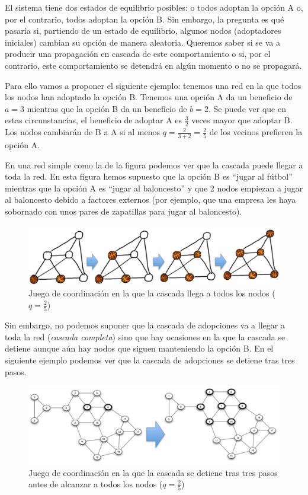 \documentclass[]{article}
\begin{document}
El sistema tiene dos estados de equilibrio posibles: o todos adoptan la
opción A o, por el contrario, todos adoptan la opción B. Sin embargo, la
pregunta es qué pasaría si, partiendo de un estado de equilibrio,
algunos nodos (adoptadores iniciales) cambian su opción de manera
aleatoria. Queremos saber si se va a producir una propagación en cascada
de este comportamiento o si, por el contrario, este comportamiento se
detendrá en algún momento o no se propagará.

Para ello vamos a proponer el siguiente ejemplo: tenemos una red en la
que todos los nodos han adoptado la opción B. Tenemos una opción A da un
beneficio de \(a=3\) mientras que la opción B da un beneficio de
\(b=2\). Se puede ver que en estas circunstancias, el beneficio de
adoptar A es \(\frac{3}{2}\) veces mayor que adoptar B. Los nodos
cambiarán de B a A si al menos \(q = \frac{2}{3+2} = \frac{2}{5}\) de
los vecinos prefieren la opción A.

En una red simple como la de la figura podemos ver que la cascada puede
llegar a toda la red. En esta figura hemos supuesto que la opción B es
``jugar al fútbol'' mientras que la opción A es ``jugar al baloncesto''
y que 2 nodos empiezan a jugar al baloncesto debido a factores externos
(por ejemplo, que una empresa les haya sobornado con unos pares de
zapatillas para jugar al baloncesto).

\begin{figure}[htbp]
\centering
\includegraphics{../images/tema08/coordinacion1.png}
\caption{Juego de coordinación en la que la cascada llega a todos los
nodos (\(q = \frac{2}{5}\))}
\end{figure}

Sin embargo, no podemos suponer que la cascada de adopciones va a llegar
a toda la red (\emph{cascada completa}) sino que hay ocasiones en la que
la cascada se detiene aunque aún hay nodos que siguen manteniendo la
opción B. En el siguiente ejemplo podemos ver que la cascada de
adopciones se detiene tras tres pasos.

\begin{figure}[htbp]
\centering
\includegraphics{../images/tema08/coordinacion2.png}
\caption{Juego de coordinación en la que la cascada se detiene tras tres
pasos antes de alcanzar a todos los nodos (\(q = \frac{2}{5}\))}
\end{figure}
\end{document}
